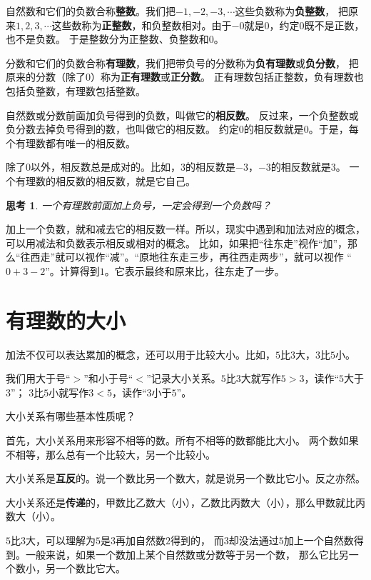 \documentclass[12pt,UTF8]{ctexbook}
\newtheorem{sk}{思考}[section]
\begin{document}
自然数和它们的负数合称\textbf{整数}。我们把$-1, -2, -3, \cdots$这些负数称为\textbf{负整数}，
把原来$1,2,3,\cdots$这些数称为\textbf{正整数}，和负整数相对。由于$-0$就是$0$，约定$0$既不是正数，也不是负数。
于是整数分为正整数、负整数和$0$。

分数和它们的负数合称\textbf{有理数}，我们把带负号的分数称为\textbf{负有理数}或\textbf{负分数}，
把原来的分数（除了$0$）称为\textbf{正有理数}或\textbf{正分数}。
正有理数包括正整数，负有理数也包括负整数，有理数包括整数。

自然数或分数前面加负号得到的负数，叫做它的\textbf{相反数}。
反过来，一个负整数或负分数去掉负号得到的数，也叫做它的相反数。
约定$0$的相反数就是$0$。于是，每个有理数都有唯一的相反数。

除了$0$以外，相反数总是成对的。比如，$3$的相反数是$-3$，$-3$的相反数就是$3$。
一个有理数的相反数的相反数，就是它自己。

\begin{sk}\label{sk:0-0-0}
    一个有理数前面加上负号，一定会得到一个负数吗？
\end{sk}

加上一个负数，就和减去它的相反数一样。所以，现实中遇到和加法对应的概念，可以用减法和负数表示相反或相对的概念。
比如，如果把“往东走”视作“加”，那么“往西走”就可以视作“减”。“原地往东走三步，再往西走两步”，就可以视作
“$0+3-2$”。计算得到$1$。它表示最终和原来比，往东走了一步。

\section{有理数的大小}
加法不仅可以表达累加的概念，还可以用于比较大小。比如，$5$比$3$大，$3$比$5$小。

我们用大于号“$>$”和小于号“$<$”记录大小关系。$5$比$3$大就写作$5>3$，读作“$5$大于$3$”；
$3$比$5$小就写作$3<5$，读作“$3$小于$5$”。

大小关系有哪些基本性质呢？

首先，大小关系用来形容不相等的数。所有不相等的数都能比大小。
两个数如果不相等，那么总有一个比较大，另一个比较小。

大小关系是\textbf{互反}的。说一个数比另一个数大，就是说另一个数比它小。反之亦然。

大小关系还是\textbf{传递}的，甲数比乙数大（小），乙数比丙数大（小），那么甲数就比丙数大（小）。

$5$比$3$大，可以理解为$5$是$3$再加自然数$2$得到的，
而$3$却没法通过$5$加上一个自然数得到。一般来说，如果一个数加上某个自然数或分数等于另一个数，
那么它比另一个数小，另一个数比它大。
\end{document}
